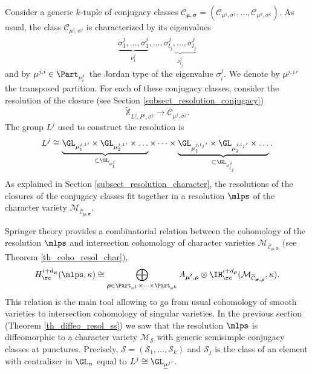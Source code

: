 Consider a generic $k$-tuple of conjugacy classes $\mathcal{C}_{\boldsymbol{\mu},\boldsymbol{\sigma}} =(\mathcal{C}_{\underline{\mu}^1,\sigma^1}, \dots, \mathcal{C}_{\underline{\mu}^k,\sigma^k})$. As usual, the class $\mathcal{C}_{\underline{\mu}^j,\sigma^j}$ is characterized by its eigenvalues
\[
\underbrace{\sigma^j_1,\dots,\sigma^j_1}_{\nu^j_1},\dots,\underbrace{\sigma^j_{l_j},\dots, \sigma^j_{l_j}}_{\nu^j_{l_j}}
\]
and by $\mu^{j,i}\in \Part_{\nu^j_i}$ the Jordan type of the eigenvalue $\sigma^{j}_i$. We denote by ${\mu^{j,i}}'$ the transposed partition. For each of these conjugacy classes, consider the resolution of the closure (see Section \ref{subsect_resolution_conjugacy})
\[
\mathbb{\widetilde{X}}_{L^j, P^j, \sigma^j}\to \overline{\mathcal{C}}_{\underline{\mu}^j,\sigma^j}.
\]
The group $L^j$ used to construct the resolution is
\[
L^j \cong \underbrace{\GL_{ {\mu^{j,1}_1}'}\times \GL_{{\mu^{j,1}_2}'} \times \dots }_{\subset \GL_{\nu^j_1}}\times \dots \times \underbrace{\GL_{{\mu^{j,l_j}_1}'}\times \GL_{{\mu^{j,l_j}_2}'} \times \dots}_{\subset \GL_{\nu^j_{l_j}}}.
\]
As explained in Section \ref{subsect_resolution_character}, the resolutions of the closures of the conjugacy classes fit together in a resolution $\mlps$ of the character variety $\mathcal{M}_{\overline{\mathcal{C}}_{\boldsymbol{\mu},\boldsymbol{\sigma}}}$.

Springer theory provides a combinatorial relation between the cohomology of the resolution $\mlps$ and intersection cohomology of character varieties $\mathcal{M}_{\overline{\mathcal{C}}_{\boldsymbol{\rho},\boldsymbol{\sigma}}}$ (see Theorem \ref{th_coho_resol_char}),
\begin{equation}\label{eq_relation_cohom_resol}
H^{i+d_{\boldsymbol{\mu}}}_\rc
(\mlps,\kappa)
\cong
\bigoplus_{\boldsymbol{\rho}\in \Part_{\nu^1}\times\dots\times \Part_{\nu^k}}
A_{\boldsymbol{\mu'},\boldsymbol{\rho}}\otimes
\IH_{\rc}^{i+d_{\boldsymbol{\rho}}}(\mathcal{M}_{\overline{\mathcal{C}}_{\boldsymbol{\sigma},\boldsymbol{\rho}}},\kappa).
\end{equation}
This relation is the main tool allowing to go from usual cohomology of smooth varieties to intersection cohomology of singular varieties. In the previous section (Theorem \ref{th_diffeo_resol_ss}) we saw that the resolution $\mlps$ is diffeomorphic to a character variety $\mathcal{M}_{\boldsymbol{\mathcal{S}}}$ with generic semisimple conjugacy classes at punctures. Precisely, $\boldsymbol{\mathcal{S}}=\left(\mathcal{S}_1,\dots,\mathcal{S}_k\right)$ and $\mathcal{S}_j$ is the class of an element with centralizer in $\GL_n$ equal to $L^j\cong \GL_{{\underline{\mu}^j}'}$.

